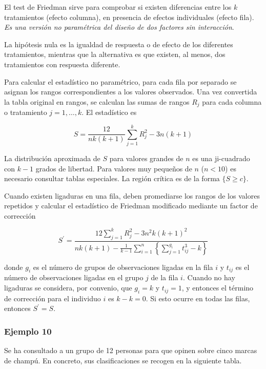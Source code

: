 \documentclass[
]{article}
\begin{document}
El test de Friedman sirve para comprobar si existen diferencias entre los \(k\) tratamientos (efecto columna), en presencia de efectos individuales (efecto fila). \emph{Es una versión no paramétrica del diseño de dos factores sin interacción}.

La hipótesis nula es la igualdad de respuesta o de efecto de los diferentes tratamientos, mientras que la alternativa es que existen, al menos, dos tratamientos con respuesta diferente.

Para calcular el estadístico no paramétrico, para cada fila por separado se asignan los rangos correspondientes a los valores observados. Una vez convertida la tabla original en rangos, se calculan las sumas de rangos \(R_{j}\) para cada columna o tratamiento \(j=1, \ldots, k\). El estadístico es

\[
S=\frac{12}{n k(k+1)} \sum_{j=1}^{k} R_{j}^{2}-3 n(k+1)
\]

La distribución aproximada de \(S\) para valores grandes de \(n\) es una ji-cuadrado con \(k-1\) grados de libertad. Para valores muy pequeños de \(n\) (\(n<10\)) es necesario consultar tablas especiales. La región crítica es de la forma \(\{S \geq c\}\).

Cuando existen ligaduras en una fila, deben promediarse los rangos de los valores repetidos y calcular el estadístico de Friedman modificado mediante un factor de corrección

\[
S^{\prime}=\frac{12 \sum_{j=1}^{k} R_{j}^{2}-3 n^{2} k(k+1)^{2}}{n k(k+1)-\frac{1}{k-1} \sum_{i=1}^{n}\left\{\sum_{j=1}^{g_{i}} t_{i j}^{3}-k\right\}}
\]

donde \(g_{i}\) es el número de grupos de observaciones ligadas en la fila \(i\) y \(t_{i j}\) es el número de observaciones ligadas en el grupo \(j\) de la fila \(i\). Cuando no hay ligaduras se considera, por convenio, que \(g_{i}=k\) y \(t_{i j}=1\), y entonces el término de corrección para el individuo \(i\) es \(k-k=0\). Si esto ocurre en todas las filas, entonces \(S^{\prime}=S\).

\subsubsection{Ejemplo 10}\label{ejemplo-10}

Se ha consultado a un grupo de 12 personas para que opinen sobre cinco marcas de champú. En concreto, sus clasificaciones se recogen en la siguiente tabla.
\end{document}
